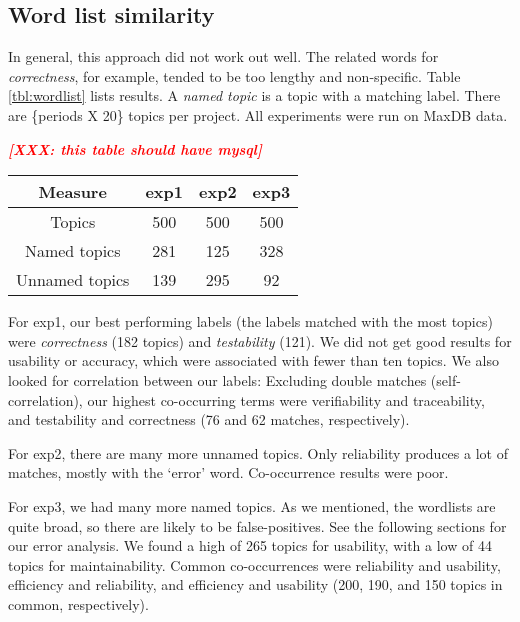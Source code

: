\documentclass{acm_proc_article-sp}
\newcommand{\XXX}[1]{\textcolor{red}{{\it \textbf{[XXX: #1]}}}}
\begin{document}
\subsection{Word list similarity}


In general, this approach did not work out well. The related words for \emph{correctness}, for example, tended to be too lengthy and non-specific. Table \ref{tbl:wordlist} lists results. A \emph{named   topic} is a topic with a matching label. There are \{periods X 20\} topics per project. All experiments were run on MaxDB data.

\XXX{this table should have mysql}
\begin{table*}[h]
	\caption{Automatic topic labeling}
	\centering
	\label{tbl:wordlist}
\begin{tabular}{c|c|c|c}
\toprule
Measure &		 \textsf{exp1} &	 \textsf{exp2} &	 \textsf{exp3} \\
\midrule
Topics &			500		 &			500  	 & 		500  \\
Named topics &		281      &			125      &		328  \\
Unnamed topics &	139      &			295      &      92   \\
\bottomrule
\end{tabular}
\end{table*}


For \textsf{exp1}, our best performing labels (the labels matched with the most topics) were \emph{correctness} (182 topics) and \emph{testability} (121). We did not get good results for usability or accuracy, which were associated with fewer than ten topics. We also looked for correlation between our labels: Excluding double matches (self-correlation), our highest co-occurring terms were verifiability and traceability, and testability and correctness (76 and 62 matches, respectively).

For \textsf{exp2}, there are many more unnamed topics. Only reliability produces a lot of matches, mostly with the `error' word. Co-occurrence results were poor.

For \textsf{exp3}, we had many more named topics. As we mentioned, the wordlists are quite broad, so there are likely to be false-positives. See the following sections for our error analysis. We found a high of 265 topics for usability, with a low of 44 topics for maintainability. Common co-occurrences were reliability and usability, efficiency and reliability, and efficiency and usability (200, 190, and 150 topics in common, respectively). 
\end{document}
